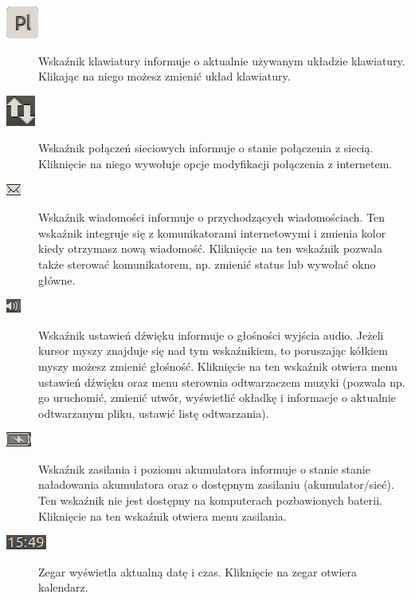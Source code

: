 \begin{description}
\item[\includegraphics{images/unity_wskaznik_klawiatura.png}]\textcolor{ubuntu_orange}{Wskaźnik klawiatury} informuje o aktualnie używanym układzie klawiatury. Klikając na niego możesz zmienić układ klawiatury.
\item[\includegraphics{images/unity_wskaznik_siec.png}]\textcolor{ubuntu_orange}{Wskaźnik połączeń sieciowych} informuje o stanie połączenia z siecią. Kliknięcie na niego wywołuje opcje modyfikacji połączenia z internetem.
\item[\includegraphics{images/unity_wskaznik_wiadomosci.png}]\textcolor{ubuntu_orange}{Wskaźnik wiadomości} informuje o przychodzących wiadomościach. Ten wskaźnik integruje się z komunikatorami internetowymi i zmienia kolor kiedy otrzymasz nową wiadomość. Kliknięcie na ten wskaźnik pozwala także sterować komunikatorem, np. zmienić status lub wywołać okno główne.
\item[\includegraphics{images/unity_wskaznik_dzwiek.png}]\textcolor{ubuntu_orange}{Wskaźnik ustawień dźwięku} informuje o głośności wyjścia audio. Jeżeli kursor myszy znajduje się nad tym wskaźnikiem, to poruszając kółkiem myszy możesz zmienić głośność. Kliknięcie na ten wskaźnik otwiera menu ustawień dźwięku oraz menu sterownia odtwarzaczem muzyki (pozwala np. go uruchomić, zmienić utwór, wyświetlić okładkę i informacje o aktualnie odtwarzanym pliku, ustawić listę odtwarzania).
\item[\includegraphics{images/unity_wskaznik_zasilanie.png}]\textcolor{ubuntu_orange}{Wskaźnik zasilania i poziomu akumulatora} informuje o stanie stanie naładowania akumulatora oraz o dostępnym zasilaniu (akumulator/sieć). Ten wskaźnik nie jest dostępny na komputerach pozbawionych baterii. Kliknięcie na ten wskaźnik otwiera menu zasilania.
\item[\includegraphics{images/unity_wskaznik_zegar.png}]\textcolor{ubuntu_orange}{Zegar} wyświetla aktualną datę i czas. Kliknięcie na zegar otwiera kalendarz.

\end{description}
